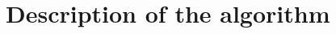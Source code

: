 \documentclass[a4paper, 11pt]{article}
\begin{document}
\restoregeometry
\tableofcontents
\newpage



\newpage

\section{Description of the algorithm}











\newpage

 

\end{document}
